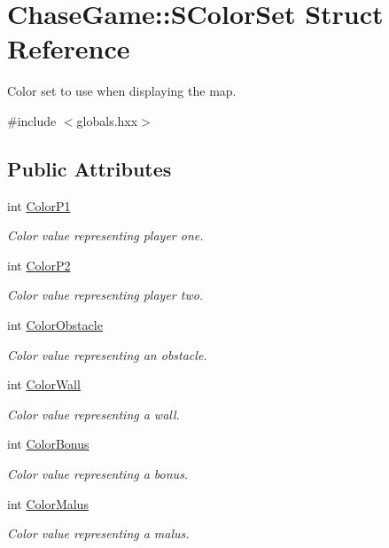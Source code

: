 \hypertarget{struct_chase_game_1_1_s_color_set}{\section{Chase\-Game\-:\-:S\-Color\-Set Struct Reference}
\label{struct_chase_game_1_1_s_color_set}
}


Color set to use when displaying the map.  




{\ttfamily \#include $<$globals.\-hxx$>$}

\subsection*{Public Attributes}
\begin{DoxyCompactItemize}
\item 
int \hyperlink{struct_chase_game_1_1_s_color_set_a51e5a557359624fe92be93cb80621922}{Color\-P1}
\begin{DoxyCompactList}\small\item\em Color value representing player one. \end{DoxyCompactList}\item 
int \hyperlink{struct_chase_game_1_1_s_color_set_a777bce7519236b269ba44d921f54e4e8}{Color\-P2}
\begin{DoxyCompactList}\small\item\em Color value representing player two. \end{DoxyCompactList}\item 
int \hyperlink{struct_chase_game_1_1_s_color_set_acb1e4df5c042ae8ca8a66d7de26a9148}{Color\-Obstacle}
\begin{DoxyCompactList}\small\item\em Color value representing an obstacle. \end{DoxyCompactList}\item 
int \hyperlink{struct_chase_game_1_1_s_color_set_a7a7a8dae118390ce5b4432aa4d99a474}{Color\-Wall}
\begin{DoxyCompactList}\small\item\em Color value representing a wall. \end{DoxyCompactList}\item 
int \hyperlink{struct_chase_game_1_1_s_color_set_aacd34496b36640358ecae127f6bb6cc4}{Color\-Bonus}
\begin{DoxyCompactList}\small\item\em Color value representing a bonus. \end{DoxyCompactList}\item 
int \hyperlink{struct_chase_game_1_1_s_color_set_aa2eb52b7d1fb4059da9935a230715498}{Color\-Malus}
\begin{DoxyCompactList}\small\item\em Color value representing a malus. \end{DoxyCompactList}\end{DoxyCompactItemize}


